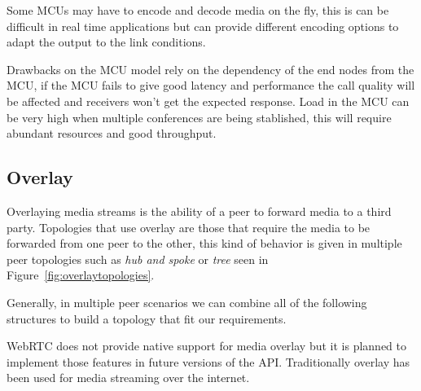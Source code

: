 Some MCUs may have to encode and decode media on the fly, this is can be difficult in real time applications but can provide different encoding options to adapt the output to the link conditions.

Drawbacks on the MCU model rely on the dependency of the end nodes from the MCU, if the MCU fails to give good latency and performance the call quality will be affected and receivers won't get the expected response. Load in the MCU can be very high when multiple conferences are being stablished, this will require abundant resources and good throughput.

\subsection{Overlay}

Overlaying media streams is the ability of a peer to forward media to a third party. Topologies that use overlay are those that require the media to be forwarded from one peer to the other, this kind of behavior is given in multiple peer topologies such as {\it hub and spoke} or {\it tree} seen in Figure~\ref{fig:overlaytopologies}.

Generally, in multiple peer scenarios we can combine all of the following structures to build a topology that fit our requirements.

WebRTC does not provide native support for media overlay but it is planned to implement those features in future versions of the API. Traditionally overlay has been used for media streaming over the internet.

